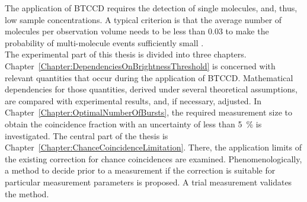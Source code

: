 The application of \gls{BTCCD} requires the detection of single molecules, and, thus, low sample concentrations. A typical criterion is that the average number of molecules per observation volume needs to be less than \num{0.03} to make the probability of multi-molecule events sufficiently small \cite{Gopich2008}. \\

The experimental part of this thesis is divided into three chapters. Chapter~\ref{Chapter:DependenciesOnBrightnessThreshold} is concerned with relevant quantities that occur during the application of \gls{BTCCD}. Mathematical dependencies for those quantities, derived under several theoretical assumptions, are compared with experimental results, and, if necessary, adjusted. In Chapter~\ref{Chapter:OptimalNumberOfBursts}, the required measurement size to obtain the coincidence fraction with an uncertainty of less than \SI{5}{\percent} is investigated. The central part of the thesis is Chapter~\ref{Chapter:ChanceCoincidenceLimitation}. There, the application limits of the existing correction for chance coincidences are examined. Phenomenologically, a method to decide prior to a measurement if the correction is suitable for particular measurement parameters is proposed. A trial measurement validates the method. 
